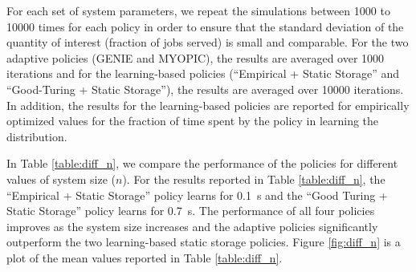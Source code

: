 \documentclass[10pt, conference, letterpaper]{IEEEtran}
\begin{document}
For each set of system parameters, we repeat the simulations between 1000 to 10000 times for each policy in order to ensure that the standard deviation of the quantity of interest (fraction of jobs served) is small and comparable. For the two adaptive policies (GENIE and MYOPIC), the results are averaged over 1000 iterations and for the learning-based policies (``Empirical + Static Storage'' and ``Good-Turing + Static Storage''), the results are averaged over 10000 iterations. In addition, the results for the learning-based policies are reported for empirically optimized values for the fraction of time spent by the policy in learning the distribution.




In Table \ref{table:diff_n}, we compare the performance of the policies for different values of system size ($n$). For the results reported in Table \ref{table:diff_n}, the ``Empirical + Static Storage'' policy learns for 0.1~s and the ``Good Turing + Static Storage'' policy learns for 0.7~s. The performance of all four policies improves as the system size increases and the adaptive policies significantly outperform the two learning-based static storage policies. Figure \ref{fig:diff_n} is a plot of the mean values reported in Table \ref{table:diff_n}.
\end{document}
